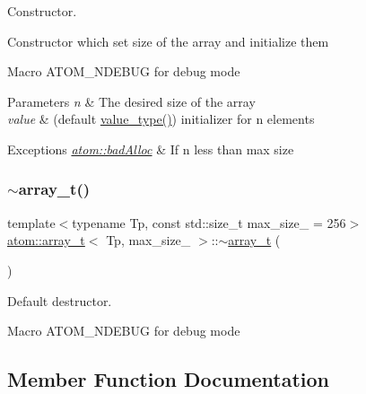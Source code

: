 Constructor. 

Constructor which set size of the array and initialize them

Macro A\+T\+O\+M\+\_\+\+N\+D\+E\+B\+UG for debug mode 
\begin{DoxyParams}{Parameters}
{\em n} & The desired size of the array \\
\hline
{\em value} & (default \hyperlink{classatom_1_1array__t_aeb485cd6190dc11ddb8e7f48c09451c4}{value\+\_\+type()}) initializer for n elements \\
\hline
\end{DoxyParams}

\begin{DoxyExceptions}{Exceptions}
{\em \hyperlink{classatom_1_1bad_alloc}{atom\+::bad\+Alloc}} & If n less than max size \\
\hline
\end{DoxyExceptions}
\mbox{\label{classatom_1_1array__t_afc5abfb4d2764ef27b0fb237e4dd63a3}} 
\subsubsection{\texorpdfstring{$\sim$array\+\_\+t()}{~array\_t()}}
{\footnotesize\ttfamily template$<$typename Tp, const std\+::size\+\_\+t max\+\_\+size\+\_\+ = 256$>$ \\
\hyperlink{classatom_1_1array__t}{atom\+::array\+\_\+t}$<$ Tp, max\+\_\+size\+\_\+ $>$\+::$\sim$\hyperlink{classatom_1_1array__t}{array\+\_\+t} (\begin{DoxyParamCaption}{ }\end{DoxyParamCaption})\hspace{0.3cm}{\ttfamily [inline]}}



Default destructor. 

Macro A\+T\+O\+M\+\_\+\+N\+D\+E\+B\+UG for debug mode 

\subsection{Member Function Documentation}
\mbox{\label{classatom_1_1array__t_a2337c7353a06e7df164112021138f7fd}} 
